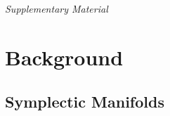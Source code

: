 \documentclass[beamer,10pt]{standalone}
\begin{document}

\begin{frame}
	\begin{center}
	\Huge\emph{Supplementary Material}
	\end{center}
\end{frame}
\note[itemize]{
	\item
}
\addtocounter{framenumber}{-1}





\section{Background}



\subsection{Symplectic Manifolds}
\end{document}
